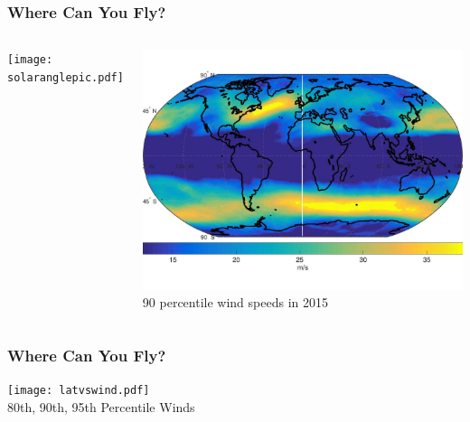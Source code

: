 \documentclass{beamer}
\begin{document}
\begin{frame}
    \frametitle{Where Can You Fly?}
    
    \pause
    \begin{columns}
        \texttt{[image: solaranglepic.pdf]}
        
        \pause
        \begin{center}
        \includegraphics[width=1.0\textwidth]{worldwinds.jpg} \\
        90 percentile wind speeds in 2015
        \end{center}
    \end{columns}

\end{frame}

\begin{frame}
    \frametitle{Where Can You Fly?}

    \begin{center}
    \texttt{[image: latvswind.pdf]} \\
    \scriptsize
    80th, 90th, 95th Percentile Winds
    \end{center}

\end{frame}
\end{document}
